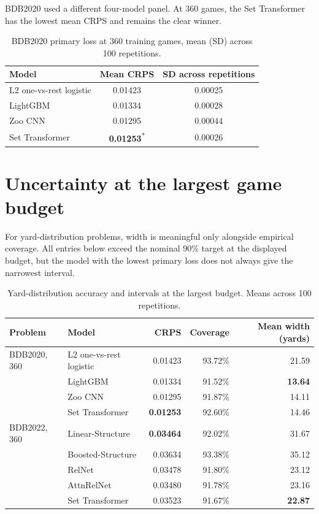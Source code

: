 \documentclass[10pt,letterpaper]{article}
\newcommand{\clearwinner}[1]{\textbf{#1}\textsuperscript{*}}
\begin{document}
BDB2020 used a different four-model panel. At 360 games, the Set Transformer has the lowest mean CRPS and remains the clear winner.

\begin{table}[ht]
\centering
\caption{BDB2020 primary loss at 360 training games, mean (SD) across 100 repetitions.}
\small
\begin{tabular}{@{}lcc@{}}
\toprule
Model & Mean CRPS & SD across repetitions \\
\midrule
L2 one-vs-rest logistic & 0.01423 & 0.00025 \\
LightGBM & 0.01334 & 0.00028 \\
Zoo CNN & 0.01295 & 0.00044 \\
Set Transformer & \clearwinner{0.01253} & 0.00026 \\
\bottomrule
\end{tabular}
\end{table}

\clearpage
\section{Uncertainty at the largest game budget}

For yard-distribution problems, width is meaningful only alongside empirical coverage. All entries below exceed the nominal 90\% target at the displayed budget, but the model with the lowest primary loss does not always give the narrowest interval.

\begin{table}[ht]
\centering
\caption{Yard-distribution accuracy and intervals at the largest budget. Means across 100 repetitions.}
\label{tab:yard-uncertainty}
\small
\setlength{\tabcolsep}{5pt}
\begin{tabular}{@{}llrrr@{}}
\toprule
Problem & Model & CRPS & Coverage & Mean width (yards) \\
\midrule
BDB2020, 360 & L2 one-vs-rest logistic & 0.01423 & 93.72\% & 21.59 \\
 & LightGBM & 0.01334 & 91.52\% & \textbf{13.64} \\
 & Zoo CNN & 0.01295 & 91.87\% & 14.11 \\
 & Set Transformer & \textbf{0.01253} & 92.60\% & 14.46 \\
\addlinespace
BDB2022, 360 & Linear-Structure & \textbf{0.03464} & 92.02\% & 31.67 \\
 & Boosted-Structure & 0.03634 & 93.38\% & 35.12 \\
 & RelNet & 0.03478 & 91.80\% & 23.12 \\
 & AttnRelNet & 0.03480 & 91.78\% & 23.16 \\
 & Set Transformer & 0.03523 & 91.67\% & \textbf{22.87} \\
\bottomrule
\end{tabular}
\end{table}
\end{document}
